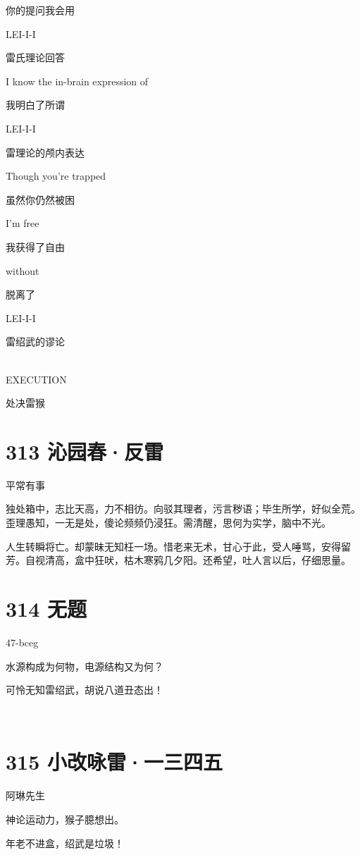 \documentclass[UTF8,12pt,oneside]{ctexbook}
\def\pau#1{\begin{center} {#1} \end{center}} %
\def\poem#1#2{\section{#1}\pau{#2}} %
\begin{document}
\begin{center}
            你的提问我会用
            
            LEI-I-I
            
            雷氏理论回答
            
            I know the in-brain expression of
            
            我明白了所谓
            
            LEI-I-I
            
            雷理论的颅内表达
            
            Though you're trapped
            
            虽然你仍然被困
            
            I'm free
            
            我获得了自由
            
            without
            
            脱离了
            
            LEI-I-I
            
            雷绍武的谬论

            ~\\
            EXECUTION
            
            处决雷猴
        \end{center}

        \poem{313 沁园春·反雷}{平常有事}

        独处箱中，志比天高，力不相彷。向驳其理者，污言秽语；毕生所学，好似全荒。歪理愚知，一无是处，傻论频频仍浸狂。需清醒，思何为实学，脑中不光。

        人生转瞬将亡。却蒙昧无知枉一场。惜老来无术，甘心于此，受人唾骂，安得留芳。自视清高，盒中狂吠，枯木寒鸦几夕阳。还希望，吐人言以后，仔细思量。

        \poem{314 无题}{47-bceg}
        \begin{center}
            水源构成为何物，电源结构又为何？

            可怜无知雷绍武，胡说八道丑态出！

            ~\\
        \end{center}

        \poem{315 小改咏雷·一三四五}{阿琳先生}
        \begin{center}
            神论运动力，猴子臆想出。

            年老不进盒，绍武是垃圾！

            ~\\
        \end{center}
\end{document}
